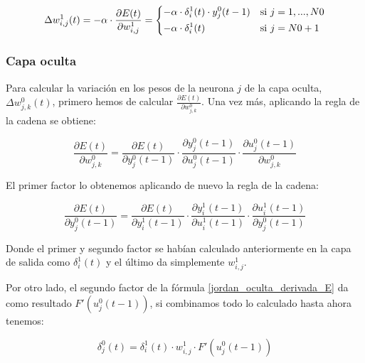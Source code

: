 \documentclass[a4paper,11pt]{article}
\begin{document}
\begin{equation}
	\Delta w_{i,j}^{1}(t) = -\alpha \cdot \frac{\partial E(t)}{\partial w_{i,j}^{1}} =
    \begin{dcases}
    	-\alpha \cdot \delta_{i}^{1}(t) \cdot y_{j}^{0}(t-1)	& \textrm{si } j=1,...,N0\\
		-\alpha \cdot \delta_{i}^{1}(t)							& \textrm{si } j=N0+1\\
	\end{dcases}
\end{equation}

\subsubsection{Capa oculta}
Para calcular la variación en los pesos de la neurona ${j}$ de la capa oculta, ${\Delta w_{j,k}^{0}(t)}$, primero hemos de calcular ${\frac{\partial E(t)}{\partial w_{j,k}^{0}}}$. Una vez más, aplicando la regla de la cadena se obtiene:

\begin{equation}
	\label{jordan_oculta_derivada_E}
	\frac{\partial E(t)}{\partial w_{j,k}^{0}} = \frac{\partial E(t)}{\partial y_{j}^{0}(t-1)} \cdot \frac{\partial y_{j}^{0}(t-1)}{\partial u_{j}^{0}(t-1)} \cdot \frac{\partial u_{j}^{0}(t-1)}{\partial w_{j,k}^{0}}
\end{equation}

El primer factor lo obtenemos aplicando de nuevo la regla de la cadena:

\begin{equation}
	\frac{\partial E(t)}{\partial y_{j}^{0}(t-1)} = \frac{\partial E(t)}{\partial y_{i}^{1}(t-1)} \cdot \frac{\partial y_{i}^{1}(t-1)}{\partial u_{i}^{1}(t-1)} \cdot \frac{\partial u_{i}^{1}(t-1)}{\partial y_{j}^{0}(t-1)}
\end{equation}

Donde el primer y segundo factor se habían calculado anteriormente en la capa de salida como ${\delta_{i}^{1}(t)}$ y el último da simplemente ${w_{i,j}^{1}}$.

Por otro lado, el segundo factor de la fórmula \ref{jordan_oculta_derivada_E} da como resultado ${F'\left(u_{j}^{0}(t-1)\right)}$, si combinamos todo lo calculado hasta ahora tenemos:

\begin{equation}
	\delta_{j}^{0}(t) = \delta_{i}^{1}(t) \cdot w_{i,j}^{1} \cdot F'\left(u_{j}^{0}(t-1)\right)
\end{equation}
\end{document}

